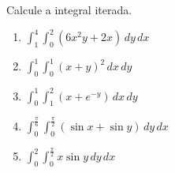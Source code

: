 



	
	
	\vspace{5mm}
	
	Calcule a integral iterada.
	
	\begin{enumerate}
		
		\item $\displaystyle \int_{1}^{4} \int_{0}^{2} (6x^{2}y + 2x) \, dy \, dx$ 
		
		\item $\displaystyle \int_{0}^{1} \int_{0}^{1} (x + y)^2 \, dx \, dy$ 
		
		\item $\displaystyle \int_{0}^{1} \int_{1}^{2} (x + e^{-y}) \, dx \, dy$ 
		
		\item $\displaystyle \int_{0}^{\frac{\pi}{6}} \int_{0}^{\frac{\pi}{2}} (\sin x + \sin y) \, dy \, dx$ 
		
		\item $\displaystyle \int_{0}^{2} \int_{0}^{\frac{\pi}{2}} x \sin y \, dy \, dx$ 
		
	\end{enumerate}
		
	\vspace{5mm}	
	
	


